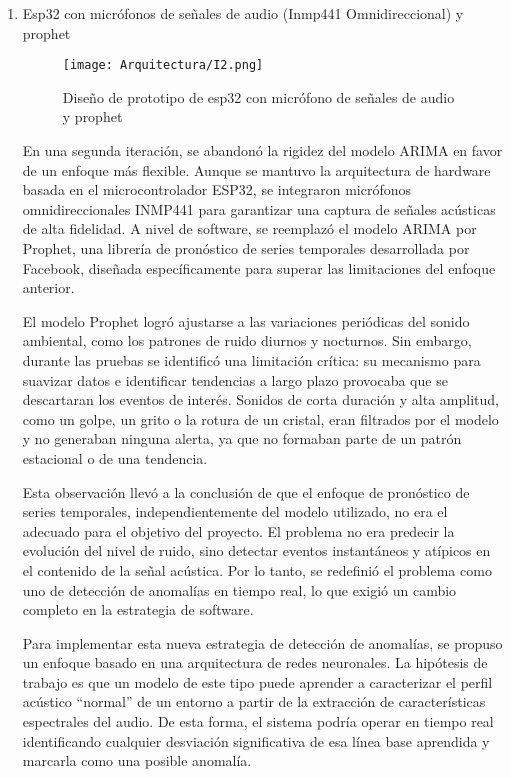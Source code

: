 \begin{enumerate}
      \item Esp32 con micrófonos de señales de audio (Inmp441 Omnidireccional) y prophet

            \begin{figure}[ht!]
                  \centering
                  \texttt{[image: Arquitectura/I2.png]}
                  \caption{Diseño de prototipo de esp32 con micrófono de señales de audio y prophet}
                  \label{fig:prototipo2}
            \end{figure}

            En una segunda iteración, se abandonó la rigidez del modelo ARIMA en favor de un enfoque más flexible. Aunque se mantuvo la arquitectura de hardware basada en el microcontrolador ESP32, se integraron micrófonos omnidireccionales INMP441 para garantizar una captura de señales acústicas de alta fidelidad. A nivel de software, se reemplazó el modelo ARIMA por Prophet, una librería de pronóstico de series temporales desarrollada por Facebook, diseñada específicamente para superar las limitaciones del enfoque anterior.

            El modelo Prophet logró ajustarse a las variaciones periódicas del sonido ambiental, como los patrones de ruido diurnos y nocturnos. Sin embargo, durante las pruebas se identificó una limitación crítica: su mecanismo para suavizar datos e identificar tendencias a largo plazo provocaba que se descartaran los eventos de interés. Sonidos de corta duración y alta amplitud, como un golpe, un grito o la rotura de un cristal, eran filtrados por el modelo y no generaban ninguna alerta, ya que no formaban parte de un patrón estacional o de una tendencia.

            Esta observación llevó a la conclusión de que el enfoque de pronóstico de series temporales, independientemente del modelo utilizado, no era el adecuado para el objetivo del proyecto. El problema no era predecir la evolución del nivel de ruido, sino detectar eventos instantáneos y atípicos en el contenido de la señal acústica. Por lo tanto, se redefinió el problema como uno de detección de anomalías en tiempo real, lo que exigió un cambio completo en la estrategia de software.

            Para implementar esta nueva estrategia de detección de anomalías, se propuso un enfoque basado en una arquitectura de redes neuronales. La hipótesis de trabajo es que un modelo de este tipo puede aprender a caracterizar el perfil acústico ``normal'' de un entorno a partir de la extracción de características espectrales del audio. De esta forma, el sistema podría operar en tiempo real identificando cualquier desviación significativa de esa línea base aprendida y marcarla como una posible anomalía.


\end{enumerate}
